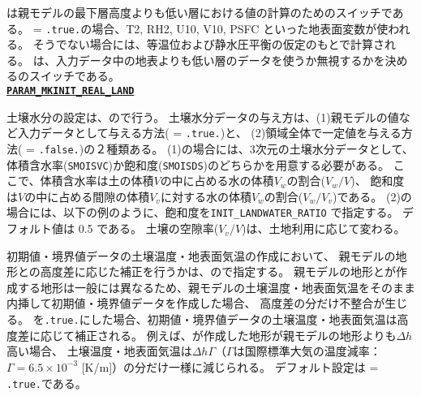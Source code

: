 は親モデルの最下層高度よりも低い層における値の計算のためのスイッチである。
 = \verb|.true.|の場合、T2, RH2, U10, V10, PSFC といった地表面変数が使われる。
そうでない場合には、等温位および静水圧平衡の仮定のもとで計算される。
は、入力データ中の地表よりも低い層のデータを使うか無視するかを決めるのスイッチである。
\\

\noindent\textbf{\underline{\texttt{PARAM\_MKINIT\_REAL\_LAND}}}

土壌水分の設定は、ので行う。
土壌水分データの与え方は、(1)親モデルの値など入力データとして与える方法( = \verb|.true.|)と、
(2)領域全体で一定値を与える方法( = \verb|.false.|)の２種類ある。
(1)の場合には、3次元の土壌水分データとして、
体積含水率(\verb|SMOISVC|)か飽和度(\verb|SMOISDS|)のどちらかを用意する必要がある。
ここで、体積含水率は土の体積$V$の中に占める水の体積$V_w$の割合($V_w / V$)、
飽和度は$V$の中に占める間隙の体積$V_v$に対する水の体積$V_w$の割合($V_w / V_v$)である。
%
(2)の場合には、以下の例のように、飽和度を\verb|INIT_LANDWATER_RATIO| で指定する。
デフォルト値は 0.5 である。
土壌の空隙率($V_v/V$)は、土地利用に応じて変わる。

初期値・境界値データの土壌温度・地表面気温の作成において、
親モデルの地形との高度差に応じた補正を行うかは、ので指定する。
親モデルの地形と\scalerm が作成する地形は一般には異なるため、親モデルの土壌温度・地表面気温をそのまま内挿して初期値・境界値データを作成した場合、
高度差の分だけ不整合が生じる。
を\verb|.true.|にした場合、初期値・境界値データの土壌温度・地表面気温は高度差に応じて補正される。
例えば、\scalerm が作成した地形が親モデルの地形よりも$\Delta h$高い場合、
土壌温度・地表面気温は$\Delta h\Gamma$（$\Gamma$は国際標準大気の温度減率：$\Gamma=6.5\times 10^{-3}$ [K/m]）の分だけ一様に減じられる。
デフォルト設定は = \verb|.true.|である。


